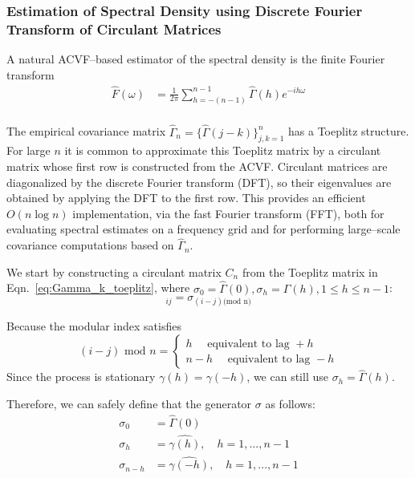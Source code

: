 \documentclass[preprint]{aastex}
\theoremstyle{nonitalicname}
\theoremstyle{plain}
\theoremstyle{remark}
\begin{document}
\subsubsection{Estimation of Spectral Density using Discrete Fourier Transform of Circulant Matrices}
A natural ACVF--based estimator of the spectral density is the finite Fourier
transform
\begin{equation}
    \begin{aligned}
        \widehat F(\omega) &= \frac{1}{2 \pi} \sum_{h = -(n-1)}^{n-1} \widehat \Gamma(h) e^{-i h \omega}\\
    \end{aligned}
\end{equation}

The empirical covariance matrix  $\widehat \Gamma_n = \{\widehat \Gamma(j-k)\}_{j,k=1}^n$ has a Toeplitz structure.
For large $n$ it is common to approximate this Toeplitz matrix by a circulant
matrix whose first row is constructed from the ACVF. Circulant matrices are
diagonalized by the discrete Fourier transform (DFT), so their eigenvalues
are obtained by applying the DFT to the first row. This provides an
efficient $O(n \log n)$ implementation, via the fast Fourier transform
(FFT), both for evaluating spectral estimates on a frequency grid and
for performing large--scale covariance computations based on $\widehat \Gamma_n$.

We start by constructing a circulant matrix $C_n$ from the Toeplitz matrix in Eqn.~\ref{eq:Gamma_k_toeplitz}, where $\sigma_0 = \widehat \Gamma(0), \sigma_{h} = \widehat \Gamma(h), 1 \leq h \leq n-1$:
\begin{equation}
    [C_n]_{ij} = \sigma_{(i-j)\text{(mod n)}}
\end{equation}

Because the modular index satisfies
\begin{equation}
    (i-j) \text{ mod }n = \begin{cases}
        h \quad \text{ equivalent to lag } +h\\
        n-h \quad  \text{ equivalent to lag } -h
    \end{cases}
\end{equation}
Since the process is stationary $\gamma(h) = \gamma(-h)$, we can still use $\sigma_h = \widehat \Gamma(h)$.

Therefore, we can safely define that the generator $\sigma$ as follows:
\begin{equation}
    \begin{aligned}
        \sigma_0 &= \widehat \Gamma(0)\\
        \sigma_h &= \hat{\gamma(h)}, \quad h = 1,...,n-1\\
        \sigma_{n-h} &= \hat{\gamma(-h)}, \quad h = 1,...,n-1\\
    \end{aligned}
\end{equation}
\end{document}
